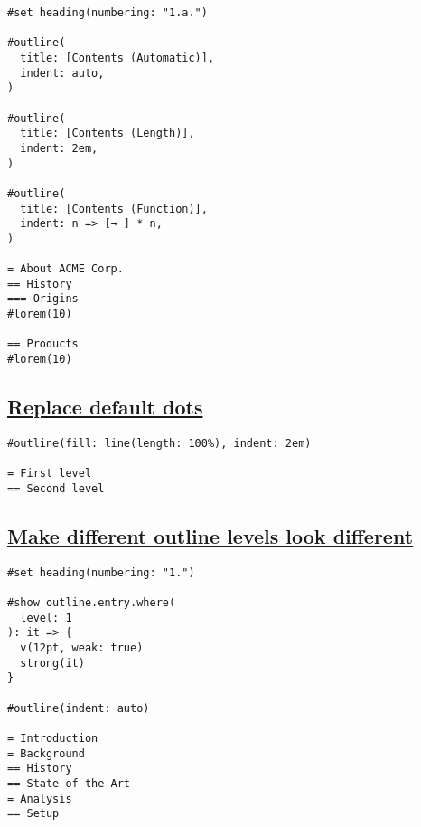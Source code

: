 \begin{verbatim}
#set heading(numbering: "1.a.")

#outline(
  title: [Contents (Automatic)],
  indent: auto,
)

#outline(
  title: [Contents (Length)],
  indent: 2em,
)

#outline(
  title: [Contents (Function)],
  indent: n => [→ ] * n,
)

= About ACME Corp.
== History
=== Origins
#lorem(10)

== Products
#lorem(10)
\end{verbatim}

\pandocbounded{}

\subsection{\texorpdfstring{\hyperref[replace-default-dots]{Replace
default dots}}{Replace default dots}}\label{replace-default-dots}

\begin{verbatim}
#outline(fill: line(length: 100%), indent: 2em)

= First level
== Second level
\end{verbatim}

\pandocbounded{}

\subsection{\texorpdfstring{\hyperref[make-different-outline-levels-look-different]{Make
different outline levels look
different}}{Make different outline levels look different}}\label{make-different-outline-levels-look-different}

\begin{verbatim}
#set heading(numbering: "1.")

#show outline.entry.where(
  level: 1
): it => {
  v(12pt, weak: true)
  strong(it)
}

#outline(indent: auto)

= Introduction
= Background
== History
== State of the Art
= Analysis
== Setup
\end{verbatim}

\pandocbounded{}

